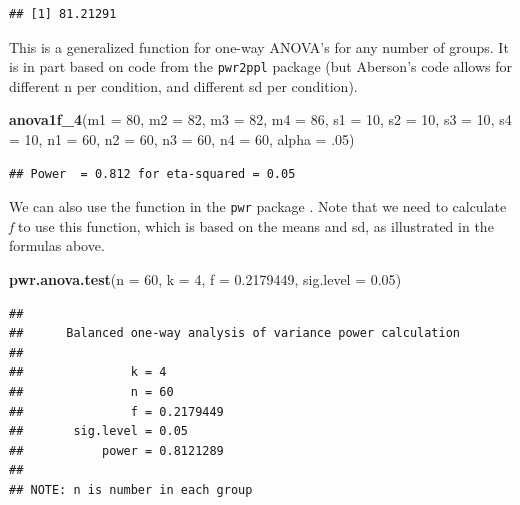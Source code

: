 \documentclass[]{book}
\newenvironment{Shaded}{\begin{snugshade}}{\end{snugshade}}
\newcommand{\DataTypeTok}[1]{\textcolor[rgb]{0.13,0.29,0.53}{#1}}
\newcommand{\DecValTok}[1]{\textcolor[rgb]{0.00,0.00,0.81}{#1}}
\newcommand{\FloatTok}[1]{\textcolor[rgb]{0.00,0.00,0.81}{#1}}
\newcommand{\KeywordTok}[1]{\textcolor[rgb]{0.13,0.29,0.53}{\textbf{#1}}}
\newcommand{\NormalTok}[1]{#1}
\begin{document}
\begin{verbatim}
## [1] 81.21291
\end{verbatim}

This is a generalized function for one-way ANOVA's for any number of groups. It is in part based on code from the \texttt{pwr2ppl} \citep{R-pwr2ppl} package (but Aberson's code allows for different n per condition, and different sd per condition).

\begin{Shaded}
\begin{Highlighting}[]
\KeywordTok{anova1f_4}\NormalTok{(}\DataTypeTok{m1 =} \DecValTok{80}\NormalTok{, }\DataTypeTok{m2 =} \DecValTok{82}\NormalTok{, }\DataTypeTok{m3 =} \DecValTok{82}\NormalTok{, }\DataTypeTok{m4 =} \DecValTok{86}\NormalTok{,}
          \DataTypeTok{s1 =} \DecValTok{10}\NormalTok{, }\DataTypeTok{s2 =} \DecValTok{10}\NormalTok{, }\DataTypeTok{s3 =} \DecValTok{10}\NormalTok{, }\DataTypeTok{s4 =} \DecValTok{10}\NormalTok{,}
          \DataTypeTok{n1 =} \DecValTok{60}\NormalTok{, }\DataTypeTok{n2 =} \DecValTok{60}\NormalTok{, }\DataTypeTok{n3 =} \DecValTok{60}\NormalTok{, }\DataTypeTok{n4 =} \DecValTok{60}\NormalTok{,}
          \DataTypeTok{alpha =} \FloatTok{.05}\NormalTok{)}
\end{Highlighting}
\end{Shaded}

\begin{verbatim}
## Power  = 0.812 for eta-squared = 0.05
\end{verbatim}

We can also use the function in the \texttt{pwr} package \citep{R-pwr}. Note that we need to calculate \emph{f} to use this function, which is based on the means and sd, as illustrated in the formulas above.

\begin{Shaded}
\begin{Highlighting}[]
\KeywordTok{pwr.anova.test}\NormalTok{(}\DataTypeTok{n =} \DecValTok{60}\NormalTok{,}
               \DataTypeTok{k =} \DecValTok{4}\NormalTok{,}
               \DataTypeTok{f =} \FloatTok{0.2179449}\NormalTok{,}
               \DataTypeTok{sig.level =} \FloatTok{0.05}\NormalTok{)}
\end{Highlighting}
\end{Shaded}

\begin{verbatim}
## 
##      Balanced one-way analysis of variance power calculation 
## 
##               k = 4
##               n = 60
##               f = 0.2179449
##       sig.level = 0.05
##           power = 0.8121289
## 
## NOTE: n is number in each group
\end{verbatim}
\end{document}
